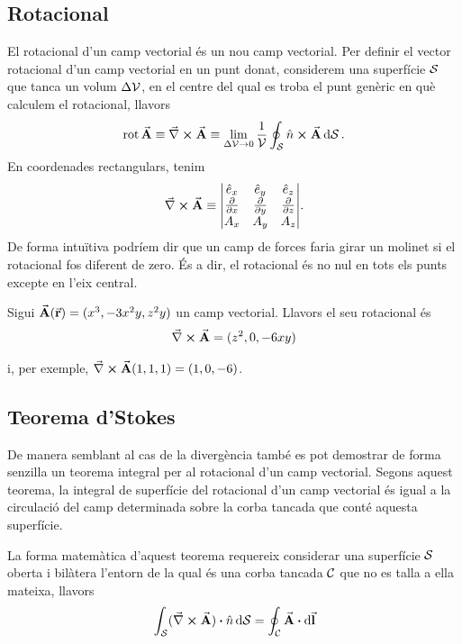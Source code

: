 \subsection{Rotacional}
El rotacional d'un camp vectorial és un nou camp vectorial. Per definir el vector rotacional d'un camp vectorial en un punt donat, considerem una superfície $\mathcal{S}$ que tanca un volum $\Delta \mathcal{V}$, en el centre del qual es troba el punt genèric en què calculem el rotacional, llavors
\begin{align}
	\operatorname{rot} \va{A} \equiv \rot{A} \equiv \lim_{\Delta \mc{V} \to 0} \frac{1}{\mc{V}} \oint_{\mc{S}} \hat{n} \cross \va{A} \dd{\mc{S}}.
\end{align}
En coordenades rectangulars, tenim
\begin{align}
	\rot{A} \equiv \mqty| \hat{e}_{x} & \hat{e}_{y} & \hat{e}_{z} \\ \pdv{}{x} & \pdv{}{y} & \pdv{}{z} \\ A_{x} & A_{y} & A_{z} |.
\end{align}
De forma intuïtiva podríem dir que un camp de forces faria girar un molinet si el rotacional fos diferent de zero. És a dir, el rotacional és no nul en tots els punts excepte en l'eix central.
\begin{example}
	Sigui $\va{A} (\va{r}) = (x^{3}, - 3x^{2}y, z^{2}y)$ un camp vectorial. Llavors el seu rotacional és
	\begin{align*}
		\rot{A} = (z^{2}, 0, -6xy)
	\end{align*}

	i, per exemple, $\rot{A} (1,1,1) = (1,0,-6)$.
\end{example}

\subsection{Teorema d'Stokes}
De manera semblant al cas de la divergència també es pot demostrar de forma senzilla un teorema integral per al rotacional d'un camp vectorial. Segons aquest teorema, la integral de superfície del rotacional d'un camp vectorial és igual a la circulació del camp determinada sobre la corba tancada que conté aquesta superfície.
\begin{thm}[d'Stokes]\label{thm:stokes}
	La forma matemàtica d'aquest teorema requereix considerar una superfície $\mathcal{S}$ oberta i bilàtera l'entorn de la qual és una corba tancada $\mathcal{C}$ que no es talla a ella mateixa, llavors
	\begin{align}
		\int_{\mc{S}} (\rot{A}) \vdot \hat{n} \dd{\mc{S}} = \oint_{\mc{C}} \va{A} \vdot \dd{\va{l}}
	\end{align}
\end{thm}


